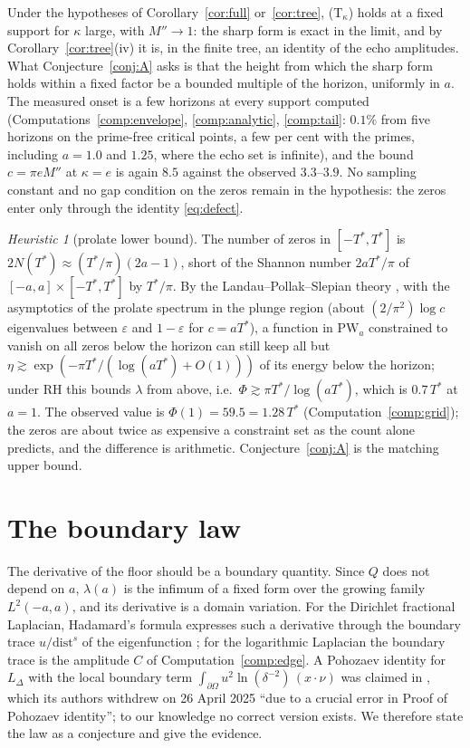 \documentclass[11pt]{article}
\theoremstyle{definition}
\theoremstyle{remark}
\newtheorem{heuristic}[theorem]{Heuristic}
\newcommand{\Tst}{T^{*}}
\newcommand{\PW}{\mathrm{PW}}
\begin{document}
Under the hypotheses of Corollary~\ref{cor:full} or~\ref{cor:tree}, (T$_\kappa$) holds at a fixed support for $\kappa$ large, with $M''\to1$: the sharp form is exact in the limit, and by Corollary~\ref{cor:tree}(iv) it is, in the finite tree, an identity of the echo amplitudes. What Conjecture~\ref{conj:A} asks is that the height from which the sharp form holds within a fixed factor be a bounded multiple of the horizon, uniformly in $a$. The measured onset is a few horizons at every support computed (Computations~\ref{comp:envelope}, \ref{comp:analytic}, \ref{comp:tail}: $0.1\%$ from five horizons on the prime-free critical points, a few per cent with the primes, including $a=1.0$ and $1.25$, where the echo set is infinite), and the bound $c=\pi e M''$ at $\kappa=e$ is again $8.5$ against the observed $3.3$--$3.9$. No sampling constant and no gap condition on the zeros remain in the hypothesis: the zeros enter only through the identity \eqref{eq:defect}.

\begin{heuristic}[prolate lower bound]\label{heur:prolate}
The number of zeros in $[-\Tst,\Tst]$ is $2N(\Tst)\approx(\Tst/\pi)(2a-1)$, short of the Shannon number $2a\Tst/\pi$ of $[-a,a]\times[-\Tst,\Tst]$ by $\Tst/\pi$. By the Landau--Pollak--Slepian theory \cite{slepian-pollak,lps}, with the asymptotics of the prolate spectrum in the plunge region \cite{slepian65,landau-widom} (about $(2/\pi^2)\log c$ eigenvalues between $\varepsilon$ and $1-\varepsilon$ for $c=a\Tst$), a function in $\PW_a$ constrained to vanish on all zeros below the horizon can still keep all but $\eta\gtrsim\exp(-\pi\Tst/(\log(a\Tst)+O(1)))$ of its energy below the horizon; under RH this bounds $\lambda$ from above, i.e.\ $\Phi\gtrsim\pi\Tst/\log(a\Tst)$, which is $0.7\,\Tst$ at $a=1$. The observed value is $\Phi(1)=59.5=1.28\,\Tst$ (Computation~\ref{comp:grid}); the zeros are about twice as expensive a constraint set as the count alone predicts, and the difference is arithmetic. Conjecture~\ref{conj:A} is the matching upper bound.
\end{heuristic}

\section{The boundary law}\label{sec:hadamard}

The derivative of the floor should be a boundary quantity. Since $Q$ does not depend on $a$, $\lambda(a)$ is the infimum of a fixed form over the growing family $L^2(-a,a)$, and its derivative is a domain variation. For the Dirichlet fractional Laplacian, Hadamard's formula expresses such a derivative through the boundary trace $u/\mathrm{dist}^s$ of the eigenfunction \cite{djitte-fall-weth}; for the logarithmic Laplacian the boundary trace is the amplitude $C$ of Computation~\ref{comp:edge}. A Pohozaev identity for $L_\Delta$ with the local boundary term $\int_{\partial\Omega}u^2\ln(\delta^{-2})\,(x\cdot\nu)$ was claimed in \cite{agv}, which its authors withdrew on 26 April 2025 ``due to a crucial error in Proof of Pohozaev identity''; to our knowledge no correct version exists. We therefore state the law as a conjecture and give the evidence.
\end{document}
